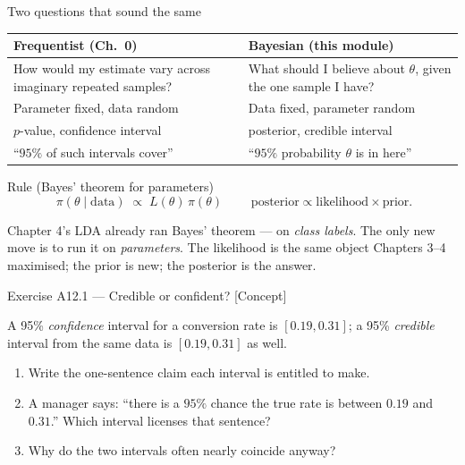 \documentclass[aspectratio=169,11pt]{beamer}
\begin{document}
\begin{frame}{Two questions that sound the same}
  \begin{center}
  \footnotesize
  \begin{tabular}{@{}p{5.4cm}p{5.9cm}@{}}
    \toprule
    \textbf{Frequentist (Ch.\ 0)} & \textbf{Bayesian (this module)} \\
    \midrule
    How would my estimate vary across imaginary repeated samples? &
    What should I believe about $\theta$, given the one sample I have? \\
    Parameter fixed, data random & Data fixed, parameter random \\
    $p$-value, confidence interval & posterior, credible interval \\
    ``$95\%$ of such intervals cover'' & ``$95\%$ probability $\theta$ is in here'' \\
    \bottomrule
  \end{tabular}
  \end{center}
  \begin{block}{Rule (Bayes' theorem for parameters)}
    \[
      \boxed{\;\pi(\theta \mid \text{data})
        \;\propto\; L(\theta)\,\pi(\theta)\;}
      \qquad \text{posterior} \propto \text{likelihood} \times \text{prior}.
    \]
  \end{block}
  \begin{readme}
    \footnotesize
    Chapter 4's LDA already ran Bayes' theorem --- on \emph{class labels}. The only
    new move is to run it on \emph{parameters}. The likelihood is the same object
    Chapters 3--4 maximised; the prior is new; the posterior is the answer.
  \end{readme}
\end{frame}

\begin{frame}{Exercise A12.1 --- Credible or confident? [Concept]}
  \begin{exercise}
    A 95\% \emph{confidence} interval for a conversion rate is $[0.19, 0.31]$; a
    95\% \emph{credible} interval from the same data is $[0.19, 0.31]$ as well.
    \begin{enumerate}
      \item Write the one-sentence claim each interval is entitled to make.
      \item A manager says: ``there is a $95\%$ chance the true rate is between
            $0.19$ and $0.31$.'' Which interval licenses that sentence?
      \item Why do the two intervals often nearly coincide anyway?
    \end{enumerate}
  \end{exercise}
\end{frame}
\end{document}
